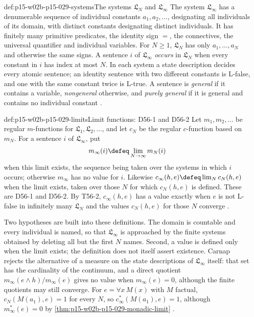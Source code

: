 \begin{hbdefinition}{def:p15-w02b-p15-029-systems}{The systems \(\mathfrak L_N\) and \(\mathfrak L_\infty\)}
The system \(\mathfrak L_\infty\) has a denumerable sequence of
individual constants \(a_1,a_2,\ldots\), designating all individuals of
its domain, with distinct constants designating distinct individuals.
It has finitely many primitive predicates, the identity sign \(=\), the
connectives, the universal quantifier and individual variables.
For \(N\geq1\), \(\mathfrak L_N\) has only \(a_1,\ldots,a_N\) and
otherwise the same signs. A sentence \(i\) of \(\mathfrak L_\infty\)
\emph{occurs} in \(\mathfrak L_N\) when every constant in \(i\)
has index at most \(N\). In each system a state description decides
every atomic sentence; an identity sentence with two different constants
is L-false, and one with the same constant twice is L-true. A sentence
is \emph{general} if it contains a variable, \emph{nongeneral}
otherwise, and \emph{purely general} if it is general and contains no
individual constant \cite[sec.~15A; D16-6f--h]{Carnap1950Probability}.
\end{hbdefinition}

\begin{hbdefinition}{def:p15-w02b-p15-029-limits}{Limit functions: D56-1 and D56-2}
Let \(m_1,m_2,\ldots\) be regular \(m\)-functions for
\(\mathfrak L_1,\mathfrak L_2,\ldots\), and let \(c_N\) be the
regular \(c\)-function based on \(m_N\). For a sentence \(i\) of
\(\mathfrak L_\infty\), put
\[
 m_\infty(i)\defeq\lim_{N\to\infty}m_N(i)
\]
when this limit exists, the sequence being taken over the systems in
which \(i\) occurs; otherwise \(m_\infty\) has no value for \(i\).
Likewise \(c_\infty(h,e)\defeq\lim_N c_N(h,e)\) when the limit
exists, taken over those \(N\) for which \(c_N(h,e)\) is defined.
These are D56-1 and D56-2. By T56-2, \(c_\infty(h,e)\) has a value
exactly when \(e\) is not L-false in infinitely many
\(\mathfrak L_N\) and the values \(c_N(h,e)\) for those \(N\)
converge \cite[sec.~56, pp.~302--304]{Carnap1950Probability}.
\end{hbdefinition}

Two hypotheses are built into these definitions. The domain is
countable and every individual is named, so that \(\mathfrak L_\infty\)
is approached by the finite systems obtained by deleting all but the
first \(N\) names. Second, a value is defined only when the limit
exists; the definition does not itself assert existence. Carnap rejects
the alternative of a measure on the state descriptions of
\(\mathfrak L_\infty\) itself: that set has the cardinality of the
continuum, and a direct quotient \(m_\infty(e\land h)/m_\infty(e)\)
gives no value when \(m_\infty(e)=0\), although the finite quotients
may still converge. For \(e=\forall x\,M(x)\) with \(M\) factual,
\(c_N(M(a_1),e)=1\) for every \(N\), so \(c^*_\infty(M(a_1),e)=1\),
although \(m^*_\infty(e)=0\) by \cref{thm:p15-w02b-p15-029-monadic-limit}
\cite[sec.~56, discussion following T56-2; T56-4]{Carnap1950Probability}.

